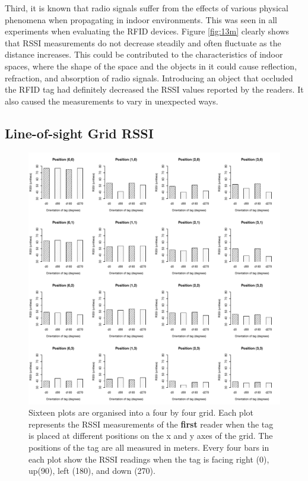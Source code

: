 Third, it is known that radio signals suffer from the effects of various physical phenomena when propagating in indoor environments. This was seen in all experiments when evaluating the RFID devices. Figure \ref{fig:13m} clearly shows that RSSI measurements do not decrease steadily and often fluctuate as the distance increases. This could be contributed to the characteristics of indoor spaces, where the shape of the space and the objects in it could cause reflection, refraction, and absorption of radio signals. Introducing an object that occluded the RFID tag had definitely decreased the RSSI values reported by the readers. It also caused the measurements to vary in unexpected ways.

\subsection{Line-of-sight Grid RSSI}

\begin{figure}[H]
	\begin{center}
		\includegraphics[width=1\textwidth]{figures/rssi_distance_grid_r1}
		\caption{Sixteen plots are organised into a four by four grid. Each plot represents the RSSI measurements of the \textbf{first} reader when the tag is placed at different positions on the x and y axes of the grid. The positions of the tag are all measured in meters. Every four bars in each plot show the RSSI readings when the tag is facing right (0\textdegree), up(90\textdegree), left (180\textdegree), and down (270\textdegree).}
	\end{center}
\end{figure}


